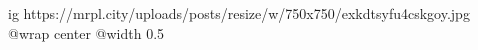  
 
 
 
 

\ifcmt
  ig https://mrpl.city/uploads/posts/resize/w/750x750/exkdtsyfu4cskgoy.jpg
  @wrap center
  @width 0.5
\fi
